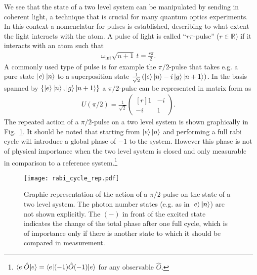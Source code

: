 We see that the state of a two level system can be manipulated by sending in coherent
  light, a technique that is crucial for many quantum optics experiments. In this 
context a nomenclatur for pulses is established, describing to what extent the
light interacts with the atom. A pulse of light is called ``$ r\pi$-pulse'' ($r\in \mathbb{R}$)
if it interacts with an atom such that
\begin{align}
  \label{eq:r_pulse}
  \omega_{\text{int}}\sqrt{n+1}\, t = \frac{r \pi}{2}.
\end{align}
A commonly used type of pulse is for example the $\pi/2$-pulse that takes e.g. a
pure state $\ket{e}\ket{n}$ to a superposition
state $\frac{1}{\sqrt{2}}\left(\ket{e}\ket{n}-i\ket{g}\ket{n+1}\right)$. In the basis spanned by $\left\lbrace
\ket{e}\ket{n}, \ket{g}\ket{n+1}\right\rbrace$ a $\pi/2$-pulse can be
represented in matrix form as
\begin{align}
  \label{eq:pi_half_matrix}
U(\pi/2) = \frac{1}{\sqrt{2}}  
\begin{pmatrix*}[r] 
      1 & -i \\
      -i & 1
    \end{pmatrix*}.
\end{align}
The repeated action of a $\pi/2$-pulse on a two level system is shown
graphically in Fig.~\ref{fig:rabi_cycle_rep}. It should be noted that starting
from $\ket{e}\ket{n}$ and performing a full rabi cycle will introduce a global
phase of $-1$ to the system. However this phase is not of physical importance
when the two level system is closed and only measurable in comparison to a
reference system.\footnote{$\braket{e|\hat{O}|e} = \braket{e|(-1)\hat{O}(-1)|e}$
for any observable $\hat{O}$.}
\begin{figure}[h]
  \centering
  \texttt{[image: rabi\_cycle\_rep.pdf]}
  \caption{Graphic representation of the action of a $\pi/2$-pulse on the state
    of a two level system. The photon number states (e.g. as in $\ket{e}\ket{n}$)
    are not shown explicitly. The $(-)$ in front of the excited state indicates
  the change of the total phase after one full cycle, which is of importance
only if there is another state to which it should be compared in measurement.}
  \label{fig:rabi_cycle_rep}
\end{figure}

